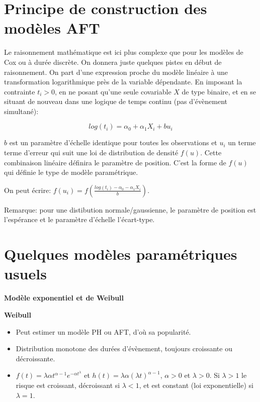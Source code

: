 \documentclass[
  12pt,
  letterpaper,
  DIV=11,
  numbers=noendperiod,
  onepage,
  openany]{scrreprt}
\providecommand{\tightlist}{%
  \setlength{\itemsep}{0pt}\setlength{\parskip}{0pt}}\usepackage{longtable,booktabs,array}
\begin{document}
\hypertarget{principe-de-construction-des-moduxe8les-aft}{%
\section{Principe de construction des modèles
AFT}\label{principe-de-construction-des-moduxe8les-aft}}

Le raisonnement mathématique est ici plus complexe que pour les modèles
de Cox ou à durée discrète. On donnera juste quelques pistes en début de
raisonnement. On part d'une expression proche du modèle linéaire à une
transformation logarithmique près de la variable dépendante. En imposant
la contrainte \(t_i>0\), en ne posant qu'une seule covariable \(X\) de
type binaire, et en se situant de nouveau dans une logique de temps
continu (pas d'évènement simultané):

\[log(t_i)= \alpha_0 +  \alpha_1X_i + bu_i\]

\(b\) est un paramètre d'échelle identique pour toutes les observations
et \(u_i\) un terme terme d'erreur qui suit une loi de distribution de
densité \(f(u)\). Cette combinaison linéaire définira le paramètre de
position. C'est la forme de \(f(u)\) qui définie le type de modèle
paramétrique.

On peut écrire:
\(f(u_i) = f(\frac{log(t_i)- \alpha_0 - \alpha_1X_i}{b})\).

Remarque: pour une distibution normale/gaussienne, le paramètre de
position est l'espérance et le paramètre d'échelle l'écart-type.

\hypertarget{quelques-moduxe8les-paramuxe9triques-usuels}{%
\section{Quelques modèles paramétriques
usuels}\label{quelques-moduxe8les-paramuxe9triques-usuels}}

\textbf{Modèle exponentiel et de Weibull}

\textbf{Weibull}

\begin{itemize}
\tightlist
\item
  Peut estimer un modèle PH ou AFT, d'où sa popularité.
\item
  Distribution monotone des durées d'évènement, toujours croissante ou
  décroissante.
\item
  \(f(t)=\lambda\alpha t^{\alpha - 1}e^{-\alpha t^\lambda}\) et
  \(h(t)=\lambda\alpha(\lambda t)^{\alpha - 1}\), \(\alpha>0\) et
  \(\lambda>0\). Si \(\lambda>1\) le risque est croissant, décroissant
  si \(\lambda<1\), et est constant (loi exponentielle) si
  \(\lambda=1\).
\end{itemize}
\end{document}
